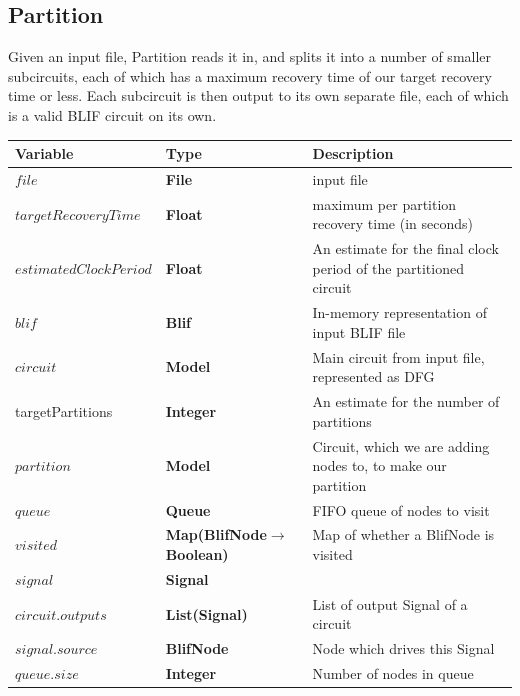 \documentclass[12pt,final,oneside,a4paper]{dwThesis} %
\begin{document}
   \newpage 
   \subsection{Partition}
   \label{algPartition} Given an input file,
   Partition reads it in, and splits it into a number of smaller subcircuits,
   each of which has a maximum recovery time of our target recovery time or
   less. Each subcircuit is then output to its own separate file, each of which
   is a valid \gls{BLIF} circuit on its own.  
   \begin{table}

      \begin{center}


         \begin{tabularx}
            {\linewidth}{llX} \toprule Variable & Type &
            Description\\
            \midrule $file$ &\textbf{File  } &  input file\\
            $targetRecoveryTime$ &\textbf{Float } &  maximum per partition
            recovery time (in seconds)\\
            $estimatedClockPeriod$ &\textbf{Float} & An estimate for the final clock period of the partitioned circuit\\
            $blif$ &\textbf{Blif } &  In-memory
            representation of input \gls{BLIF} file\\
            $circuit$ &\textbf{Model }
            &  Main circuit from input file, represented as DFG\\
            targetPartitions & \textbf{Integer} & An estimate for the number of partitions \\
            $partition$
            &\textbf{Model } &  Circuit, which we are adding nodes to, to
            make our partition\\
            $queue$ &\textbf{Queue } &  FIFO queue of
            nodes to visit\\
            $visited$ &\textbf{Map(BlifNode$\to$ Boolean)}
            &  Map of whether a BlifNode is visited\\
            $signal$ &\textbf{Signal } &  \\
            $circuit.outputs$ &\textbf{List(Signal) } &
            List of output Signal of a circuit\\
            $signal.source$ &\textbf{BlifNode } &  Node which drives this Signal\\
            $queue.size$
            &\textbf{Integer } &  Number of nodes in queue\\

\end{tabularx}
\end{center}
\end{table}
\end{document}
